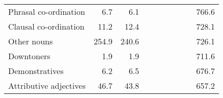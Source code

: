 \begin{table}[!t]
\begin{tabular*}{\linewidth}{@{\extracolsep{\fill}}lrrrrrrrrr}
Phrasal co-ordination & 6.7 & 6.1 & {\cellcolor[HTML]{92C5DE}{\textcolor[HTML]{000000}{144\%}}} & {\cellcolor[HTML]{92C5DE}{\textcolor[HTML]{000000}{194\%}}} & {\cellcolor[HTML]{92C5DE}{\textcolor[HTML]{000000}{187\%}}} & {\cellcolor[HTML]{92C5DE}{\textcolor[HTML]{000000}{170\%}}} & {\cellcolor[HTML]{F7F7F7}{\textcolor[HTML]{000000}{92\%}}} & {\cellcolor[HTML]{F7F7F7}{\textcolor[HTML]{000000}{97\%}}} & 766.6 \\ 
Clausal co-ordination & 11.2 & 12.4 & {\cellcolor[HTML]{F4A582}{\textcolor[HTML]{000000}{63\%}}} & {\cellcolor[HTML]{F4A582}{\textcolor[HTML]{000000}{59\%}}} & {\cellcolor[HTML]{92C5DE}{\textcolor[HTML]{000000}{141\%}}} & {\cellcolor[HTML]{D1E5F0}{\textcolor[HTML]{000000}{127\%}}} & {\cellcolor[HTML]{D1E5F0}{\textcolor[HTML]{000000}{120\%}}} & {\cellcolor[HTML]{D1E5F0}{\textcolor[HTML]{000000}{116\%}}} & 728.1 \\ 
Other nouns & 254.9 & 240.6 & {\cellcolor[HTML]{F7F7F7}{\textcolor[HTML]{000000}{97\%}}} & {\cellcolor[HTML]{F7F7F7}{\textcolor[HTML]{000000}{103\%}}} & {\cellcolor[HTML]{F7F7F7}{\textcolor[HTML]{000000}{91\%}}} & {\cellcolor[HTML]{F7F7F7}{\textcolor[HTML]{000000}{95\%}}} & {\cellcolor[HTML]{F7F7F7}{\textcolor[HTML]{000000}{91\%}}} & {\cellcolor[HTML]{F7F7F7}{\textcolor[HTML]{000000}{94\%}}} & 726.1 \\ 
Downtoners & 1.9 & 1.9 & {\cellcolor[HTML]{92C5DE}{\textcolor[HTML]{000000}{155\%}}} & {\cellcolor[HTML]{D1E5F0}{\textcolor[HTML]{000000}{118\%}}} & {\cellcolor[HTML]{F4A582}{\textcolor[HTML]{000000}{60\%}}} & {\cellcolor[HTML]{F4A582}{\textcolor[HTML]{000000}{57\%}}} & {\cellcolor[HTML]{F4A582}{\textcolor[HTML]{000000}{68\%}}} & {\cellcolor[HTML]{F4A582}{\textcolor[HTML]{000000}{73\%}}} & 711.6 \\ 
Demonstratives & 6.2 & 6.5 & {\cellcolor[HTML]{92C5DE}{\textcolor[HTML]{000000}{137\%}}} & {\cellcolor[HTML]{D1E5F0}{\textcolor[HTML]{000000}{133\%}}} & {\cellcolor[HTML]{FDDBC7}{\textcolor[HTML]{000000}{77\%}}} & {\cellcolor[HTML]{FDDBC7}{\textcolor[HTML]{000000}{80\%}}} & {\cellcolor[HTML]{FDDBC7}{\textcolor[HTML]{000000}{75\%}}} & {\cellcolor[HTML]{FDDBC7}{\textcolor[HTML]{000000}{80\%}}} & 676.7 \\ 
Attributive adjectives & 46.7 & 43.8 & {\cellcolor[HTML]{92C5DE}{\textcolor[HTML]{000000}{140\%}}} & {\cellcolor[HTML]{92C5DE}{\textcolor[HTML]{000000}{150\%}}} & {\cellcolor[HTML]{F7F7F7}{\textcolor[HTML]{000000}{100\%}}} & {\cellcolor[HTML]{F7F7F7}{\textcolor[HTML]{000000}{104\%}}} & {\cellcolor[HTML]{FDDBC7}{\textcolor[HTML]{000000}{79\%}}} & {\cellcolor[HTML]{FDDBC7}{\textcolor[HTML]{000000}{83\%}}} & 657.2 \\ 

\end{tabular*}
\end{table}
